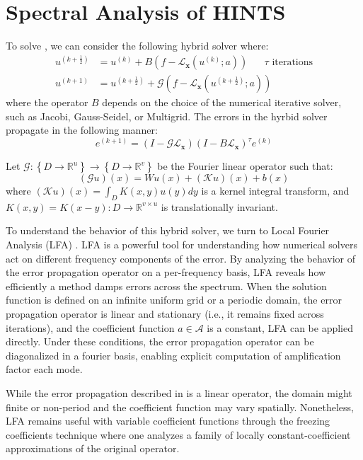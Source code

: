 \documentclass[12pt]{article}
\begin{document}
\section{Spectral Analysis of HINTS}


To solve , we can consider the following hybrid solver where:
\begin{align*}
    u^{\left(k + \frac{1}{2}\right)} &= u^{\left(k \right)} + B(f - \mathcal{L}_{\mathbf{x}}\left(u^{\left(k \right)}; a\right)) \quad \text{ $\tau$ iterations}\\
    u^{\left(k + 1\right)} &= u^{\left(k + \frac{1}{2}\right)} + \mathcal{G}\left(f - \mathcal{L}_{\mathbf{x}}\left(u^{\left(k + \frac{1}{2}\right)}; a\right)\right)
\end{align*}
where the operator $B$ depends on the choice of the numerical iterative solver, such as Jacobi, Gauss-Seidel, or Multigrid. The errors in the hyrbid solver propagate in the following manner:
\begin{equation}
    e^{(k+1)} = \left(I - \mathcal{G} \mathcal{L}_{\mathbf{x}}\right)\left(I - B \mathcal{L}_{\mathbf{x}}\right)^{\tau}e^{(k)} \label{eq:errorhybrid}
\end{equation}


Let $\mathcal{G}: \left\{D \to \mathbb{R}^u\right\} \to \left\{D \to \mathbb{R}^v\right\}$ be the Fourier linear operator such that:
$$\left(\mathcal{G}u\right)(x) = Wu(x) + (\mathcal{K}u)(x) + b(x)$$
where $(\mathcal{K}u)(x) =  \int_{D}K(x, y)u(y)dy$ is a kernel integral transform, and $K(x, y) = K(x - y): D \to \mathbb{R}^{v \times u}$ is translationally invariant. 

To understand the behavior of this hybrid solver, we turn to Local Fourier Analysis (LFA) \cite{brandt1977multi}. LFA is a powerful tool for understanding how numerical solvers act on different frequency components of the error. By analyzing the behavior of the error propagation operator on a per-frequency basis, LFA reveals how efficiently a method damps errors across the spectrum. When the solution function is defined on an infinite uniform grid or a periodic domain, the error propagation operator is linear and stationary (i.e., it remains fixed across iterations), and the coefficient function $a \in \mathcal{A}$ is a constant, LFA can be applied directly. Under these conditions, the error propagation operator can be diagonalized in a fourier basis, enabling explicit computation of amplification factor each mode. 

While the error propagation described in  is a linear operator, the domain might finite or non-period and the coefficient function may vary spatially. Nonetheless, LFA remains useful with variable coefficient functions through the freezing coefficients technique where one analyzes a family of locally constant-coefficient approximations of the original operator.  
\end{document}
